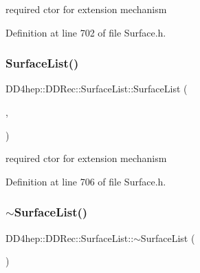 required c\textquotesingle{}tor for extension mechanism 



Definition at line 702 of file Surface.\+h.

\hypertarget{class_d_d4hep_1_1_d_d_rec_1_1_surface_list_a1655044af6ad83e5d51e8513718a8f34}{}\label{class_d_d4hep_1_1_d_d_rec_1_1_surface_list_a1655044af6ad83e5d51e8513718a8f34} 
\subsubsection{\texorpdfstring{Surface\+List()}{SurfaceList()}\hspace{0.1cm}{\footnotesize\ttfamily [4/4]}}
{\footnotesize\ttfamily D\+D4hep\+::\+D\+D\+Rec\+::\+Surface\+List\+::\+Surface\+List (\begin{DoxyParamCaption}\item[{const \hyperlink{class_d_d4hep_1_1_d_d_rec_1_1_surface_list}{Surface\+List} \&}]{,  }\item[{const \hyperlink{class_d_d4hep_1_1_geometry_1_1_det_element}{Geometry\+::\+Det\+Element} \&}]{ }\end{DoxyParamCaption})\hspace{0.3cm}{\ttfamily [inline]}}



required c\textquotesingle{}tor for extension mechanism 



Definition at line 706 of file Surface.\+h.

\hypertarget{class_d_d4hep_1_1_d_d_rec_1_1_surface_list_a8ba1884b4e65fbd42703cb8059cb0fb2}{}\label{class_d_d4hep_1_1_d_d_rec_1_1_surface_list_a8ba1884b4e65fbd42703cb8059cb0fb2} 
\subsubsection{\texorpdfstring{$\sim$\+Surface\+List()}{~SurfaceList()}}
{\footnotesize\ttfamily D\+D4hep\+::\+D\+D\+Rec\+::\+Surface\+List\+::$\sim$\+Surface\+List (\begin{DoxyParamCaption}{ }\end{DoxyParamCaption})\hspace{0.3cm}{\ttfamily [virtual]}}



